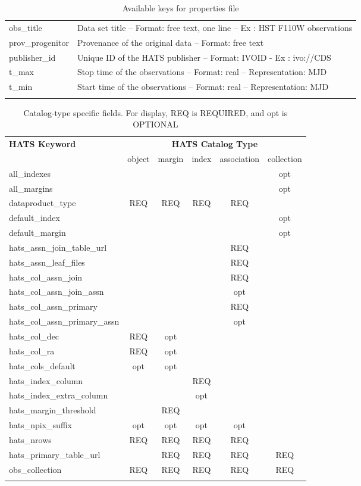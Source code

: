 \documentclass[11pt,a4paper]{ivoa}
\begin{document}
\begin{longtable}[h!]{D{0.33\textwidth} D{0.67\textwidth}}
obs\_title &Data set title – Format: free text, one line – Ex : HST F110W observations \\
prov\_progenitor &Provenance of the original data – Format: free text \\
publisher\_id &Unique ID of the HATS publisher – Format: IVOID - Ex : ivo://CDS \\
t\_max &Stop time of the observations – Format: real – Representation: MJD \\
t\_min &Start time of the observations – Format: real – Representation: MJD \\
\sptablerule    
\caption{Available keys for properties file}
\label{tab:properties}
\end{longtable}

\begin{table}[h!]
\footnotesize\begin{tabular}{l c c c c c}
\sptablerule
\textbf{HATS Keyword} &\multicolumn{5}{c}{\textbf{HATS Catalog Type}} \\
\rowcolor{white}
& object & margin & index & association  & collection \\
\sptablerule
all\_indexes & & & & &opt \\
all\_margins & & & & &opt \\
dataproduct\_type &REQ &REQ &REQ &REQ & \\
default\_index & & & & &opt \\
default\_margin & & & & &opt \\
hats\_assn\_join\_table\_url & & & &REQ & \\
hats\_assn\_leaf\_files & & & &REQ & \\
hats\_col\_assn\_join & & & &REQ & \\
hats\_col\_assn\_join\_assn & & & &opt & \\
hats\_col\_assn\_primary & & & &REQ & \\
hats\_col\_assn\_primary\_assn & & & &opt & \\
hats\_col\_dec &REQ &opt & & & \\
hats\_col\_ra &REQ &opt & & & \\
hats\_cols\_default &opt &opt & & & \\
hats\_index\_column & & &REQ & & \\
hats\_index\_extra\_column & & &opt & & \\
hats\_margin\_threshold & &REQ & & & \\
hats\_npix\_suffix &opt &opt &opt &opt & \\
hats\_nrows &REQ &REQ &REQ &REQ & \\
hats\_primary\_table\_url & &REQ &REQ &REQ &REQ \\
obs\_collection &REQ &REQ &REQ &REQ &REQ \\
\sptablerule
\end{tabular}
\caption{Catalog-type specific fields. For display, REQ is REQUIRED, and opt is OPTIONAL}
\label{tab:propertyRequirements}
\end{table}
\end{document}
